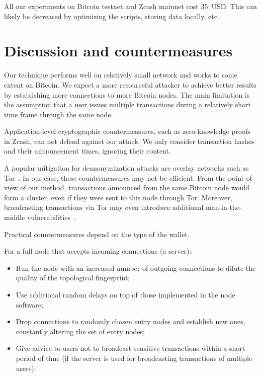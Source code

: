 All our experiments on Bitcoin testnet and Zcash mainnet cost $35$~USD.
This can likely be decreased by optimizing the scripts, storing data locally, etc.


\section{Discussion and countermeasures}

Our technique performs well on relatively small network and works to some extent on Bitcoin.
We expect a more resourceful attacker to achieve better results by establishing more connections to more Bitcoin nodes.
The main limitation is the assumption that a user issues multiple transactions during a relatively short time frame through the same node.

Application-level cryptographic countermeasures, such as zero-knowledge proofs in Zcash, can not defend against our attack.
We only consider transaction hashes and their announcement times, ignoring their content.

A popular mitigation for deanonymization attacks are overlay networks such as Tor~\cite{Tor}.
In our case, these countermeasures may not be efficient.
From the point of view of our method, transactions announced from the same Bitcoin node would form a cluster, even if they were sent to this node through Tor.
Moreover, broadcasting transactions via Tor may even introduce additional man-in-the-middle vulnerabilities~\cite{Biryukov2015}.

Practical countermeasures depend on the type of the wallet.

For a full node that accepts incoming connections (a server):

\begin{itemize}
	\item Run the node with an increased number of outgoing connections to dilute the quality of the topological fingerprint;
	\item Use additional random delays on top of those implemented in the node software;
	\item Drop connections to randomly chosen entry nodes and establish new ones, constantly altering the set of entry nodes;
	\item Give advice to users not to broadcast sensitive transactions within a short period of time (if the server is used for broadcasting transactions of multiple users).
\end{itemize}

